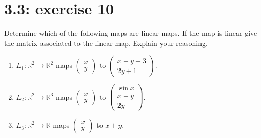 \documentclass{report}
\begin{document}
\section*{3.3: exercise 10} 
Determine which of the following maps are linear maps.  If the map is linear give the matrix associated to the linear map. Explain your reasoning.

\begin{enumerate}
 \item $L_1: \mathbb{R}^2 \to \mathbb{R}^2$ maps $\begin{pmatrix} x \\ y \end{pmatrix}$ to $\begin{pmatrix} x + y + 3 \\ 2y + 1 \end{pmatrix}$.
    \item $L_2: \mathbb{R}^2 \to \mathbb{R}^3$ maps $\begin{pmatrix} x \\ y \end{pmatrix}$ to $\begin{pmatrix} \sin x \\ x + y \\ 2y \end{pmatrix}$.
    \item $L_3: \mathbb{R}^2 \to \mathbb{R}$ maps $\begin{pmatrix} x \\ y \end{pmatrix}$ to $x + y$.


\end{enumerate}


\sol
\end{document}
